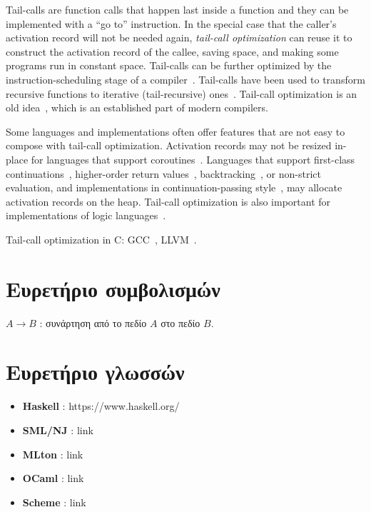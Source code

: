 \documentclass[diploma]{softlab-thesis}
\begin{document}
Tail-calls are function calls that happen last inside a function and
they can be implemented with a ``go to'' instruction. In the special
case that the caller's activation record will not be needed again,
\emph{tail-call optimization} can reuse it to construct the activation
record of the callee, saving space, and making some programs run in
constant space. Tail-calls can be further optimized by the
instruction-scheduling stage of a compiler~\cite[\S12.4.3]{Torczon12}.
Tail-calls have been used to transform recursive functions to
iterative (tail-recursive)
ones~\cite[\S{9}]{McCarthy62}\cite{Barron68}.  Tail-call optimization
is an old idea~\cite[p.~7]{Gill65}\cite[p.~21]{Knuth74}, which is an
established part of modern compilers.

Some languages and implementations often offer features that are not
easy to compose with tail-call optimization. Activation records may
not be resized in-place for languages that support
coroutines~\cite[p.~60]{Waite84}. Languages that support first-class
continuations~\cite{Sperber10}, higher-order return
values~\cite[p.~103]{Appel92}\cite{Steele78},
backtracking~\cite{Bobrow73}, or non-strict evaluation, and
implementations in continuation-passing style~\cite[p.~103]{Appel92},
may allocate activation records on the heap. Tail-call optimization is
also important for implementations of logic languages~\cite{Bigot99}.

Tail-call optimization in C: GCC~\cite{Probst01}, LLVM~\cite{Pandey:2015:LC:2842773}.

\chapter{Ευρετήριο συμβολισμών}

$A \rightarrow B$ : συνάρτηση από το πεδίο $A$ στο πεδίο $B$.

\chapter{Ευρετήριο γλωσσών}
\begin{itemize}
  \item \textbf{Haskell} : https://www.haskell.org/
  \item \textbf{SML/NJ}  : link
  \item \textbf{MLton}   : link
  \item \textbf{OCaml}   : link
  \item \textbf{Scheme}  : link
\end{itemize}




\end{document}
